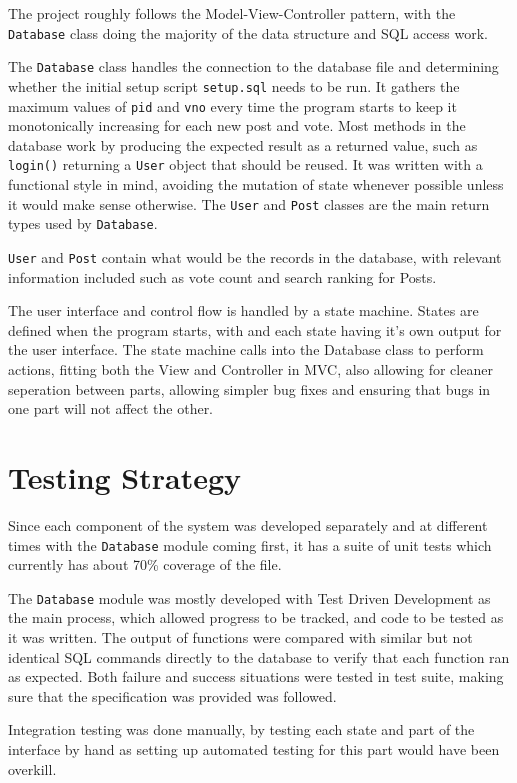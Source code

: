 \documentclass{article}
\begin{document}
The project roughly follows the Model-View-Controller pattern, with the \verb|Database| class doing the majority of the data structure and SQL access work. %

The \verb|Database| class handles the connection to the database file and determining whether the initial setup script \verb|setup.sql| needs to be run. It gathers the maximum values of \verb|pid| and \verb|vno| every time the program starts to keep it monotonically increasing for each new post and vote. Most methods in the database work by producing the expected result as a returned value, such as \verb|login()| returning a \verb|User| object that should be reused. It was written with a functional style in mind, avoiding the mutation of state whenever possible unless it would make sense otherwise. The \verb|User| and \verb|Post| classes are the main return types used by \verb|Database|.

\verb|User| and \verb|Post| contain what would be the records in the database, with relevant information included such as vote count and search ranking for Posts.

The user interface and control flow is handled by a state machine. States are defined when the program starts, with and each state having it's own output for the user interface. The state machine calls into the Database class to perform actions, fitting both the View and Controller in MVC, also allowing for cleaner seperation between parts, allowing simpler bug fixes and ensuring that bugs in one part will not affect the other.

\section{Testing Strategy}
Since each component of the system was developed separately and at different times with the \verb|Database| module coming first, it has a suite of unit tests which currently has about 70\% coverage of the file.

The \verb|Database| module was mostly developed with Test Driven Development as the main process, which allowed progress to be tracked, and code to be tested as it was written. The output of functions were compared with similar but not identical SQL commands directly to the database to verify that each function ran as expected. Both failure and success situations were tested in test suite, making sure that the specification was provided was followed.

Integration testing was done manually, by testing each state and part of the interface by hand as setting up automated testing for this part would have been overkill.
\end{document}
